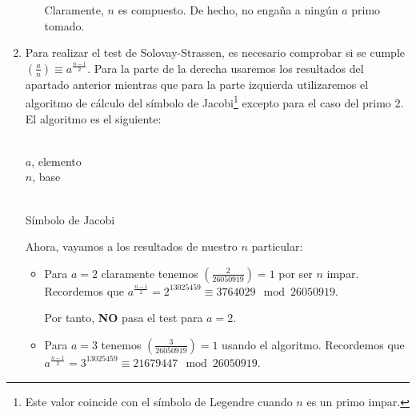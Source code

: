 \begin{enumerate}
\begin{itemize}
			Claramente, $n$ es compuesto. De hecho, no engaña a ningún $a$ primo tomado.
		\end{itemize}
		
		\item Para realizar el test de Solovay-Strassen, es necesario comprobar si se cumple $\displaystyle \left(
		\frac{a}{n} \right) \equiv a^{\frac{n-1}{2}}$. Para la parte de la derecha usaremos los resultados del
		apartado anterior mientras que para la parte izquierda utilizaremos el algoritmo de cálculo del símbolo
		de Jacobi\footnote{Este valor coincide con el símbolo de Legendre cuando $n$ es un primo impar.} excepto
		para el caso del primo 2. El algoritmo es el siguiente:
		\begin{algorithm}[H]
			\begin{algorithmic}[1]
				\REQUIRE \ \\
					\texttt{$a$}, elemento \\
					\texttt{$n$}, base \\ \
						\ENDIF
					\ENDWHILE
					\ENDIF
				\ENDWHILE
				\ELSE
				\ENDIF
			\end{algorithmic}
			\caption{Símbolo de Jacobi}
			\label{Jac-symbol}
		\end{algorithm}
		
		Ahora, vayamos a los resultados de nuestro $n$ particular:
				
		\begin{itemize}
			\item Para $a = 2$ claramente tenemos $\displaystyle \left(\frac{2}{26050919} \right) = 1$ por ser
			$n$ impar. Recordemos que $ a^{\frac{n-1}{2}} = 2^{13025459} \equiv 3764029 \mod 26050919$.
			
			Por tanto, \textbf{NO} pasa el test para $a = 2$.
				
			\item Para $a = 3$ tenemos $\displaystyle \left(\frac{3}{26050919} \right) = 1$ usando el algoritmo.
			Recordemos que $ a^{\frac{n-1}{2}} = 3^{13025459} \equiv 21679447 \mod 26050919$.


\end{itemize}
\end{enumerate}

